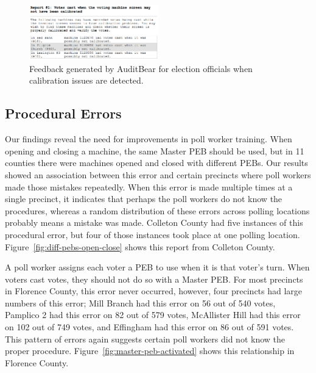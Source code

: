 \documentclass[letterpaper,twocolumn,10pt]{article}
\begin{document}
\begin{figure}[htbp]
\begin{center}
    \includegraphics[width=0.5\textwidth,height=0.2\textheight]{NotCalibrated.eps}
\end{center}
\caption{Feedback generated by AuditBear for election officials when calibration issues are detected.}
\label{fig:calibration-issues}
\end{figure}

\subsection{Procedural Errors}
Our findings reveal the need for improvements in poll worker training. When
opening and closing a machine, the same Master PEB should be used, but in 11
counties there were machines opened and closed with different PEBs. Our results
showed an association between this error and certain precincts where poll workers
made those mistakes repeatedly.  
When this error is made multiple times at a single precinct, it indicates 
that perhaps the poll workers do
not know the procedures, whereas a random distribution of these errors across
polling locations probably means a mistake was made. Colleton County had five
instances of this procedural error, but four of those instances took place at
one polling location. Figure~\ref{fig:diff-pebs-open-close} shows this report
from Colleton County.  

A poll worker assigns each voter a PEB to use when it is that voter's turn. When 
voters cast votes, they should not do so with a Master PEB. For most precincts
in Florence County, this error never occurred, however, four precincts had large
numbers of this error; Mill Branch had  
this error on 56 out of 540 votes, Pamplico 2 had this error on 82 out of 579 
votes, McAllister Hill had this error on 102 out of 749 votes, and Effingham 
had this error on 86 out of 591 votes. This pattern of errors again suggests
certain poll workers did not know the proper
procedure. Figure~\ref{fig:master-peb-activated}  
shows this relationship in Florence County. 
\end{document}
